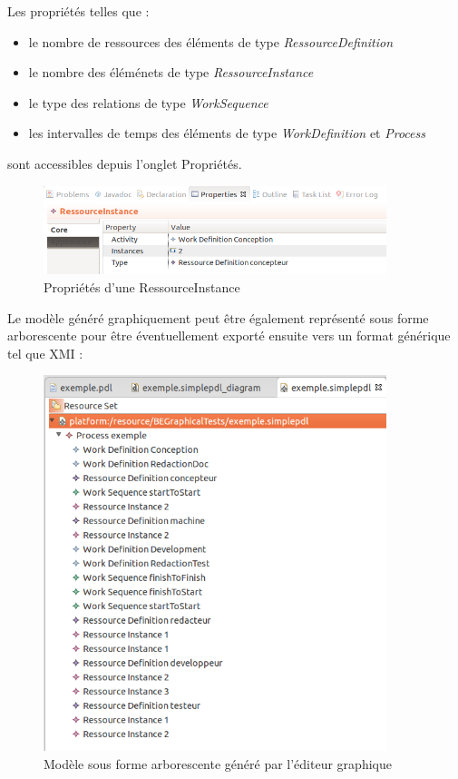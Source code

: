 \documentclass{report}
\begin{document}
Les propriétés telles que :
\begin{itemize}
\item le nombre de ressources des éléments de type \textit{RessourceDefinition}
\item le nombre des éléménets de type \textit{RessourceInstance}
\item le type des relations de type \textit{WorkSequence}
\item les intervalles de temps des éléments de type \textit{WorkDefinition} et \textit{Process}
\end{itemize}
sont accessibles depuis l'onglet Propriétés.

\begin{figure}[!h] 
\begin{center}
\includegraphics[width=10cm]{Capture-10.png}
\caption{Propriétés d'une RessourceInstance} 
\label{img1} 
\end{center}
\end{figure} 

Le modèle généré graphiquement peut être également représenté sous forme arborescente pour être éventuellement exporté ensuite vers un format générique tel que XMI :

\begin{figure}[!h] 
\begin{center}
\includegraphics[width=10cm]{Capture-9.png}
\caption{Modèle sous forme arborescente généré par l'éditeur graphique} 
\label{img1} 
\end{center}
\end{figure} 
\end{document}
